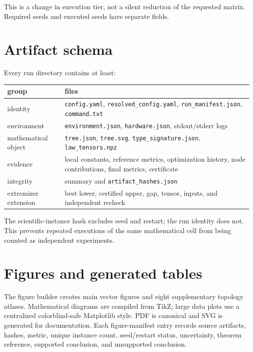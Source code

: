 \documentclass[11pt]{amsart}
\begin{document}
This is a change in execution tier, not a silent reduction of the requested
matrix.  Required seeds and executed seeds have separate fields.

\section{Artifact schema}

Every run directory contains at least:

\begin{center}
\small
\begin{tabularx}{.96\textwidth}{@{}lX@{}}
\toprule
group & files\\
\midrule
identity & \texttt{config.yaml}, \texttt{resolved\_config.yaml}, \texttt{run\_manifest.json}, \texttt{command.txt}\\
environment & \texttt{environment.json}, \texttt{hardware.json}, stdout/stderr logs\\
mathematical object & \texttt{tree.json}, \texttt{tree.svg}, \texttt{type\_signature.json}, \texttt{law\_tensors.npz}\\
evidence & local constants, reference metrics, optimization history, node contributions, final metrics, certificate\\
integrity & summary and \texttt{artifact\_hashes.json}\\
extremizer extension & best lower, certified upper, gap, tensor, inputs, and independent recheck\\
\bottomrule
\end{tabularx}
\end{center}

The scientific-instance hash excludes seed and restart; the run identity does
not.  This prevents repeated executions of the same mathematical cell from
being counted as independent experiments.

\section{Figures and generated tables}

The figure builder creates \VThreeFigureCount{} main vector figures and eight
supplementary topology atlases.  Mathematical diagrams are compiled from TikZ;
large data plots use a centralized colorblind-safe Matplotlib style.  PDF is
canonical and SVG is generated for documentation.  Each figure-manifest entry
records source artifacts, hashes, metric, unique instance count, seed/restart
status, uncertainty, theorem reference, supported conclusion, and unsupported
conclusion.
\end{document}
